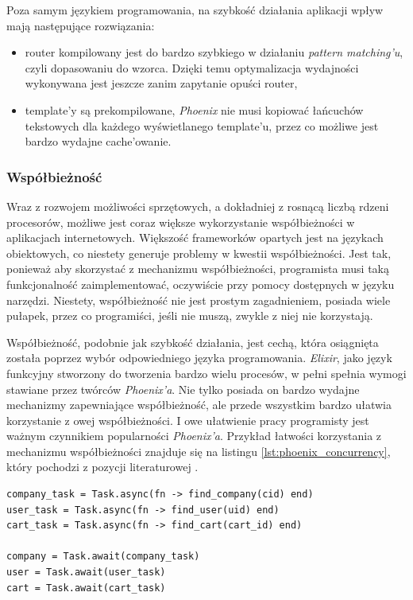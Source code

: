 \documentclass[mgr,oneside]{mgr}
\begin{document}
Poza samym językiem programowania, na szybkość działania aplikacji wpływ mają następujące rozwiązania:
\begin{itemize}
  \item router kompilowany jest do bardzo szybkiego w działaniu \textit{pattern matching'u}, czyli dopasowaniu do wzorca. Dzięki temu optymalizacja wydajności wykonywana jest jeszcze zanim zapytanie opuści router,
  \item template'y są prekompilowane, \textit{Phoenix} nie musi kopiować łańcuchów tekstowych dla każdego wyświetlanego template'u, przez co możliwe jest bardzo wydajne cache'owanie.
\end{itemize}

\subsubsection{Współbieżność}
Wraz z rozwojem możliwości sprzętowych, a dokładniej z rosnącą liczbą rdzeni procesorów, możliwe jest coraz większe wykorzystanie współbieżności w aplikacjach internetowych. Większość frameworków opartych jest na językach obiektowych, co niestety generuje problemy w kwestii współbieżności. Jest tak, ponieważ aby skorzystać z mechanizmu współbieżności, programista musi taką funkcjonalność zaimplementować, oczywiście przy pomocy dostępnych w języku narzędzi. Niestety, współbieżność nie jest prostym zagadnieniem, posiada wiele pułapek, przez co programiści, jeśli nie muszą, zwykle z niej nie korzystają.

Współbieżność, podobnie jak szybkość działania, jest cechą, która osiągnięta została poprzez wybór odpowiedniego języka programowania. \textit{Elixir}, jako język funkcyjny stworzony do tworzenia bardzo wielu procesów, w pełni spełnia wymogi stawiane przez twórców \textit{Phoenix'a}. Nie tylko posiada on bardzo wydajne mechanizmy zapewniające współbieżność, ale przede wszystkim bardzo ułatwia korzystanie z owej współbieżności. I owe ułatwienie pracy programisty jest ważnym czynnikiem popularności \textit{Phoenix'a}. Przykład łatwości korzystania z mechanizmu współbieżności znajduje się na listingu \ref{lst:phoenix_concurrency}, który pochodzi z pozycji literaturowej \cite{phoenix_doctrine}.

\begin{lstlisting}[label={lst:phoenix_concurrency}, caption=Współbieżność w Phoenix'ie]
company_task = Task.async(fn -> find_company(cid) end)
user_task = Task.async(fn -> find_user(uid) end)
cart_task = Task.async(fn -> find_cart(cart_id) end)

company = Task.await(company_task)
user = Task.await(user_task)
cart = Task.await(cart_task)
\end{lstlisting}
\end{document}
